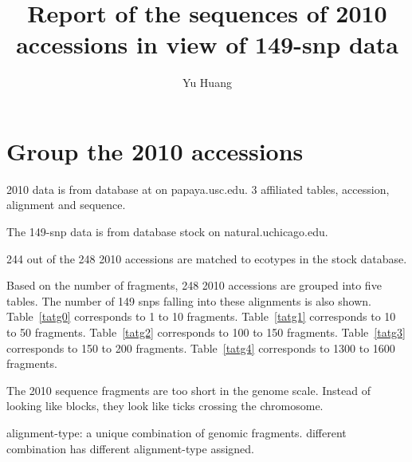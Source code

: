 \documentclass[a2paper, 10pt]{article}
\title{Report of the sequences of 2010 accessions in view of 149-snp data}
\author{Yu Huang}
\begin{document}
\maketitle

\begin{abstract}
\end{abstract}

\section{Group the 2010 accessions}

2010 data is from database at on papaya.usc.edu. 3 affiliated tables, accession, alignment and sequence.

The 149-snp data is from database stock on natural.uchicago.edu.

244 out of the 248 2010 accessions are matched to ecotypes in the stock database.

Based on the number of fragments, 248 2010 accessions are grouped into five tables. The number of 149 snps falling into these alignments is also shown. Table~\ref{tatg0} corresponds to 1 to 10 fragments. Table~\ref{tatg1} corresponds to 10 to 50 fragments. Table~\ref{tatg2} corresponds to 100 to 150 fragments. Table~\ref{tatg3} corresponds to 150 to 200 fragments. Table~\ref{tatg4} corresponds to 1300 to 1600 fragments.

The 2010 sequence fragments are too short in the genome scale. Instead of looking like blocks, they look like ticks crossing the chromosome.

alignment-type: a unique combination of genomic fragments. different combination has different alignment-type assigned.


\end{document}
